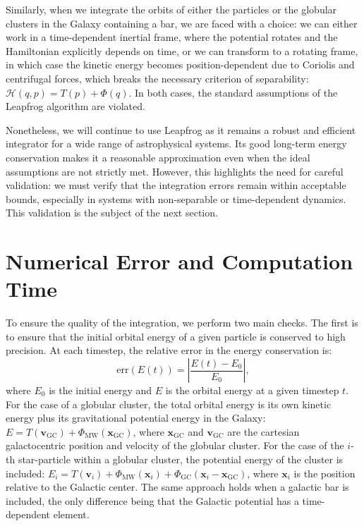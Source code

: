     Similarly, when we integrate the orbits of either the particles or the globular clusters in the Galaxy containing a bar, we are faced with a choice: we can either work in a time-dependent inertial frame, where the potential rotates and the Hamiltonian explicitly depends on time, or we can transform to a rotating frame, in which case the kinetic energy becomes position-dependent due to Coriolis and centrifugal forces, which breaks the necessary criterion of separability: $\mathcal{H}(q,p) = T(p)+\Phi(q)$. In both cases, the standard assumptions of the Leapfrog algorithm are violated.

    Nonetheless, we will continue to use Leapfrog as it remains a robust and efficient integrator for a wide range of astrophysical systems. Its good long-term energy conservation makes it a reasonable approximation even when the ideal assumptions are not strictly met. However, this highlights the need for careful validation: we must verify that the integration errors remain within acceptable bounds, especially in systems with non-separable or time-dependent dynamics. This validation is the subject of the next section.

\section{Numerical Error and Computation Time}
    To ensure the quality of the integration, we perform two main checks. The first is to ensure that the initial orbital energy of a given particle is conserved to high precision. At each timestep, the relative error in the energy conservation is:
    \begin{equation} 
        \mathrm{err}(E(t)) = \left|\frac{E(t) - E_0}{E_0}\right|,
    \end{equation} 
    where $E_0$ is the initial energy and $E$ is the orbital energy at a given timestep $t$. For the case of a globular cluster, the total orbital energy is its own kinetic energy plus its gravitational potential energy in the Galaxy: $E = T(\mathbf{v}_{\mathrm{GC}}) + \Phi_{\mathrm{MW}}\left(\mathbf{x}_{\mathrm{GC}}\right)$, where $\mathbf{x}_{\mathrm{GC}}$ and $\mathbf{v}_{\mathrm{GC}}$ are the cartesian galactocentric position and velocity of the globular cluster. For the case of the $i$-th star-particle within a globular cluster, the potential energy of the cluster is included: $E_i = T(\textbf{v}_i) + \Phi_{\mathrm{MW}}\left(\textbf{x}_i\right) + \Phi_\mathrm{GC}\left(\textbf{x}_i - \textbf{x}_{\mathrm{GC}}\right)$, where $\mathbf{x}_i$ is the position relative to the Galactic center. The same approach holds when a galactic bar is included, the only difference being that the Galactic potential has a time-dependent element. 

